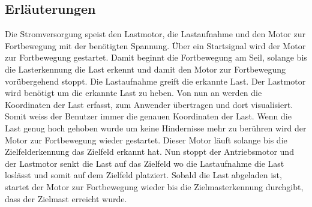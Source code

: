 \documentclass[a4paper,11pt]{scrartcl}
\begin{document}
\subsection{Erläuterungen}

Die Stromversorgung speist den Lastmotor, die Lastaufnahme und den Motor zur Fortbewegung mit der benötigten Spannung.  Über ein Startsignal wird der Motor zur Fortbewegung gestartet. Damit beginnt die Fortbewegung am Seil, solange bis die Lasterkennung die Last erkennt und damit den Motor zur Fortbewegung vorübergehend stoppt.  Die Lastaufnahme greift die erkannte Last. Der Lastmotor wird benötigt um die erkannte Last zu heben.  Von nun an werden die Koordinaten der Last erfasst, zum Anwender übertragen und dort visualisiert. Somit weiss der Benutzer immer die genauen Koordinaten der Last.  Wenn die Last genug hoch gehoben wurde um keine Hindernisse mehr zu berühren wird der Motor zur Fortbewegung wieder gestartet.  Dieser Motor läuft solange bis die Zielfelderkennung das Zielfeld erkannt hat.  Nun stoppt der Antriebsmotor und der Lastmotor senkt die Last auf das Zielfeld wo die Lastaufnahme die Last loslässt und somit auf dem Zielfeld platziert. Sobald die Last abgeladen ist, startet der Motor zur Fortbewegung wieder bis die Zielmasterkennung durchgibt, dass der Zielmast erreicht wurde.

\newpage

\pagestyle{empty}
\end{document}
